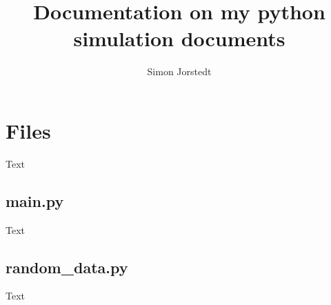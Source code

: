\documentclass{article}
\title{Documentation on my python simulation documents}
\author{Simon Jorstedt}
\begin{document}
\maketitle


\section{Files}
Text

\subsection{main.py}
Text

\subsection{random\_data.py}
Text
\end{document}
